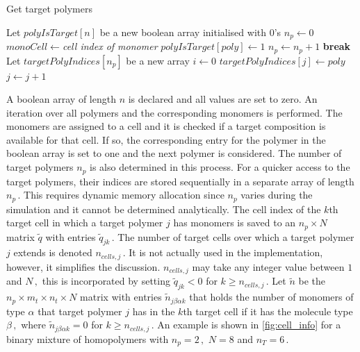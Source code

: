 \documentclass[bachelor,       %
               oneside,        %
               BCOR10mm,       %
               ngerman, english %
               ]{GAUBM}
\begin{document}
\begin{algorithm}[H]
\caption{Get target polymers}\label{alg:get_flip_candidates}
\begin{algorithmic}[1]
\State Let $polyIsTarget[n]$ be a new boolean array initialised with $0$'s
\State $n_p\gets 0$
        \State $monoCell\gets$\textit{cell index of monomer}
            \State $polyIsTarget[poly]\gets 1$
            \State $n_p\gets n_p+1$
            \State \textbf{break}
        \EndIf
    \EndFor
\EndFor
\State Let $targetPolyIndices[n_p]$ be a new array
\State $i\gets 0$
        \State $targetPolyIndices[j]\gets poly$
        \State $j\gets j+1$
    \EndIf
\EndFor
\end{algorithmic}
\end{algorithm}
 
A boolean array of length $n$ is declared and all values are set to zero. An iteration over all polymers and the corresponding monomers is performed. The monomers are assigned to a cell and it is checked if a target composition is available for that cell. If so, the corresponding entry for the polymer in the boolean array is set to one and the next polymer is considered. The number of target polymers $n_p$ is also determined in this process. For a quicker access to the target polymers, their indices are stored sequentially in a separate array of length $n_p\,.$ This requires dynamic memory allocation since $n_p$ varies during the simulation and it cannot be determined analytically. The cell index of the $k$th target cell in which a target polymer $j$ has monomers is saved to an $n_p\times N$ matrix $\tilde q$ with entries $\tilde q_{jk}\,.$ The number of target cells over which a target polymer $j$ extends is denoted $n_{cells,j}\,.$ It is not actually used in the implementation, however, it simplifies the discussion. $n_{cells,j}$ may take any integer value between $1$ and $N\,,$ this is incorporated by setting $\tilde q_{jk}<0$ for $k\ge n_{cells,j}\,.$ Let $\tilde n$ be the $n_p\times m_t\times n_t\times N$ matrix with entries $\tilde n_{j\beta\alpha k}$ that holds the number of monomers of type $\alpha$ that target polymer $j$ has in the $k$th target cell if it has the molecule type $\beta\,,$ where $\tilde n_{j\beta\alpha k}=0$ for $k\ge n_{cells,j}\,.$ An example is shown in \autoref{fig:cell_info} for a binary mixture of homopolymers with $n_p=2\,,$ $N=8$ and $n_T=6\,.$
\end{document}
